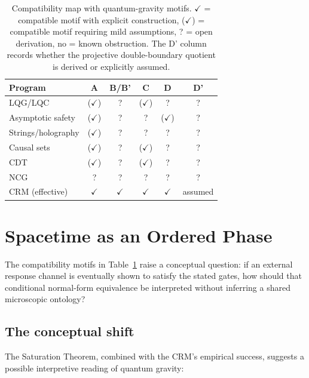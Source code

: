 \documentclass[aps,prd,twocolumn,superscriptaddress,nofootinbib]{revtex4-2}
\begin{document}
\begin{table}[t]
\caption{Compatibility map with quantum-gravity motifs. $\checkmark$ = compatible motif with explicit construction, ($\checkmark$) = compatible motif requiring mild assumptions, ? = open derivation, no = known obstruction. The D' column records whether the projective double-boundary quotient is derived or explicitly assumed.}
\label{tab:axiom_check}
\begin{ruledtabular}
\begin{tabular}{lccccc}
Program & A & B/B' & C & D & D' \\
\hline
LQG/LQC & ($\checkmark$) & ? & ($\checkmark$) & ? & ? \\
Asymptotic safety & ($\checkmark$) & ? & ? & ($\checkmark$) & ? \\
Strings/holography & ($\checkmark$) & ? & ? & ? & ? \\
Causal sets & ($\checkmark$) & ? & ($\checkmark$) & ? & ? \\
CDT & ($\checkmark$) & ? & ($\checkmark$) & ? & ? \\
NCG & ? & ? & ? & ? & ? \\
CRM (effective) & $\checkmark$ & $\checkmark$ & $\checkmark$ & $\checkmark$ & assumed \\
\end{tabular}
\end{ruledtabular}
\end{table}


\section{Spacetime as an Ordered Phase}
\label{sec:ontology}

The compatibility motifs in Table~\ref{tab:axiom_check} raise a conceptual question: if an external response channel is eventually shown to satisfy the stated gates, how should that conditional normal-form equivalence be interpreted without inferring a shared microscopic ontology?

\subsection{The conceptual shift}

The Saturation Theorem, combined with the CRM's empirical success, suggests a possible interpretive reading of quantum gravity:
\end{document}
